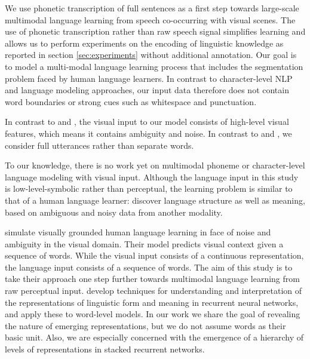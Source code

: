 We use phonetic transcription of full sentences as a first step
towards large-scale multimodal language learning from speech
co-occurring with visual scenes. 
The use of phonetic
transcription rather than raw speech signal simplifies learning
and allows us to perform experiments on the encoding of linguistic
knowledge as reported in section \ref{sec:experiments} without
additional annotation. Our goal is to model a multi-modal language learning process that includes the segmentation problem faced by human language learners. In contrast to character-level NLP and language modeling approaches, our input data therefore does not contain word boundaries or strong cues such as whitespace and punctuation.

In contrast to 
and , the visual input to our model consists
of high-level visual features, which means it contains ambiguity and
noise. In contrast to  and
, we consider full utterances rather than
separate words. 

To our knowledge, there is no work yet on multimodal phoneme or character-level language modeling with visual input.
Although the language input in this study is low-level-symbolic rather
than perceptual, the learning problem is similar to that of a human language learner: discover language structure as well as meaning, based on ambiguous and noisy data from another modality. 

 simulate visually grounded human
language learning in face of noise and ambiguity in the visual
domain. Their model predicts visual context given a sequence of words. While the visual input consists of a continuous representation, the language input consists of a sequence of words. The aim of this study is to take their approach one step further towards multimodal language learning from raw perceptual input. 
 develop techniques for understanding
and interpretation of the representations of linguistic form and
meaning in recurrent neural networks, and apply these to word-level
models. In our work we share the goal of revealing the nature of
emerging representations, but we do not assume words as their basic
unit. Also, we are especially concerned with the emergence of a
hierarchy of levels of representations in stacked recurrent networks. 